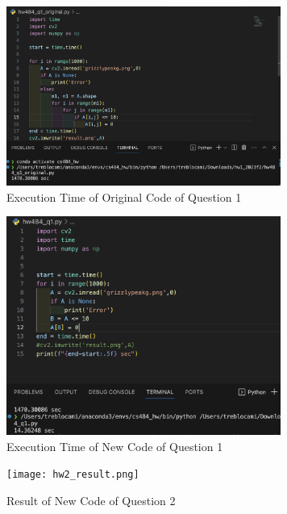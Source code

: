 \documentclass[11pt]{article}
\begin{document}
\pagebreak

\begin{figure}
\centerline{\includegraphics[width=9cm]{q1_original_execution.png}}
\caption{Execution Time of Original Code of Question 1}
\end{figure}

\begin{figure}
\centerline{\includegraphics[width=9cm]{q1_execution.png}}
\caption{Execution Time of New Code of Question 1}
\end{figure}

\begin{figure}
\centerline{\texttt{[image: hw2\_result.png]}}
\caption{Result of New Code of Question 2}
\end{figure}
\end{document}
